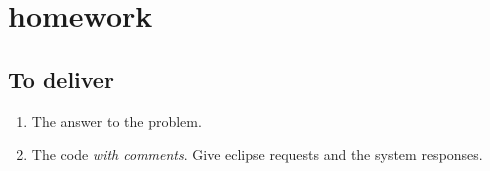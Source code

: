 \section{homework}

\subsection{To deliver}

\begin{enumerate}
\item The answer to the problem.
\item The code \eclipse{} \emph{with comments}. Give eclipse requests
   and the system responses.
   \end{enumerate}

